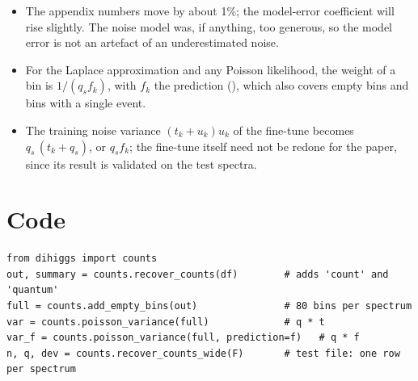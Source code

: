 \begin{itemize}
  \item The appendix numbers move by about 1\%; the model-error coefficient will rise
    slightly. The noise model was, if anything, too generous, so the model error is not an
    artefact of an underestimated noise.
  \item For the Laplace approximation and any Poisson likelihood, the weight of a bin is
    $1/(q_s f_k)$, with $f_k$ the prediction (),
    which also covers empty bins and bins with a single event.
  \item The training noise variance $(t_k + u_k)u_k$ of the fine-tune becomes
    $q_s\,(t_k + q_s)$, or $q_s f_k$; the fine-tune itself need not be redone for the
    paper, since its result is validated on the test spectra.
\end{itemize}

\section{Code}

\begin{lstlisting}
from dihiggs import counts
out, summary = counts.recover_counts(df)        # adds 'count' and 'quantum'
full = counts.add_empty_bins(out)               # 80 bins per spectrum
var = counts.poisson_variance(full)             # q * t
var_f = counts.poisson_variance(full, prediction=f)   # q * f
n, q, dev = counts.recover_counts_wide(F)       # test file: one row per spectrum
\end{lstlisting}


